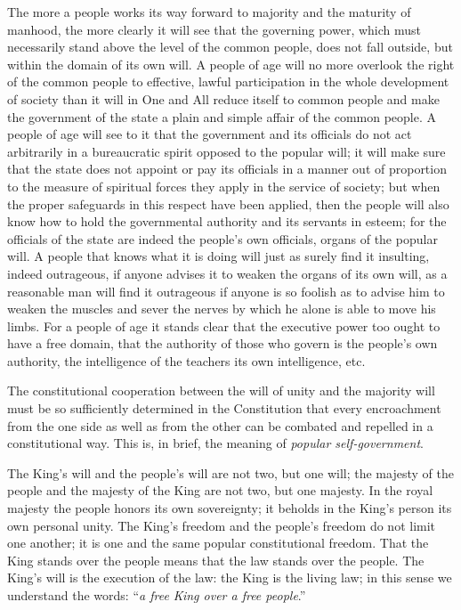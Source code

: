 \documentclass[12pt,a4paper,openany]{book}
\newcommand{\opage}[1]{\marginnote{\footnotesize\textit{[#1]}}}
\begin{document}
The more a people works its way forward to majority
and the maturity of manhood, the more clearly it will see that
the governing power, which must necessarily stand above the level of the common people,
does not fall outside, but within the domain of its
own will. A people of age will no more
overlook the right of the common people to effective, lawful
participation in the whole development of society than it will in
One and All reduce itself to common people and make the government of the state
a plain and simple affair of the common people. A people of age
will see to it that the government and its officials do not
act arbitrarily in a bureaucratic spirit
\setcounter{footnote}{0}%
\opage{34}opposed to the popular will; it will make sure that the state does not
appoint or pay its officials in a manner
out of proportion to the measure of spiritual forces
they apply in the service of society; but when the
proper safeguards in this respect have been applied,
then the people will also know how to hold the governmental authority
and its servants in esteem; for the officials of the
state are indeed the people's own officials, organs of the popular will. A people that knows what it is doing
will just as surely find it insulting, indeed outrageous,
if anyone advises it to weaken the organs of its own will,
as a reasonable man will find it outrageous
if anyone is so foolish as to advise him to weaken
the muscles and sever the nerves by which he
alone is able to move his limbs. For
a people of age it stands clear that the executive
power too ought to have a free domain, that the authority of those who govern
is the people's own authority, the intelligence of the teachers
its own intelligence, etc.

The constitutional cooperation between the will of unity
and the majority will must be so sufficiently
determined in the Constitution that every encroachment from
the one side as well as from the other can be combated and repelled
in a constitutional way. This is, in brief,
the meaning of \emph{popular self-government}.

The King's will and the people's will are not two, but one
will; the majesty of the people and the majesty of the King are not
two, but one majesty. In the royal majesty the
people honors its own sovereignty; it beholds in the King's
person its own personal unity. The King's freedom
and the people's freedom do not limit one another; it is
\setcounter{footnote}{0}%
\opage{35}one and the same popular constitutional freedom. That the King
stands over the people means that the law stands over the people.
The King's will is the execution of the law: the King is the
living law; in this sense we understand the words: ``\emph{a free
King over a free people}.''
\end{document}
